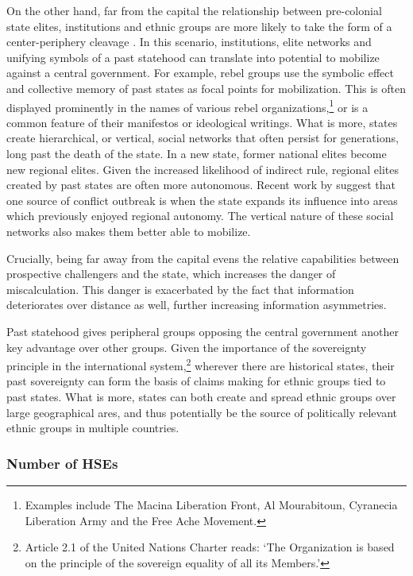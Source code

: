 On the other hand, far from the capital the relationship between pre-colonial
state elites, institutions and ethnic groups are more likely to take the form of
a center-periphery cleavage \citep{1967Psav}. In this scenario, institutions,
elite networks and unifying symbols of a past statehood can translate into
potential to mobilize against a central government. For example, rebel groups
use the symbolic effect and collective memory of past states as focal points for
mobilization. This is often displayed prominently in the names of various rebel
organizations,\footnote{Examples include The Macina Liberation Front, Al
Mourabitoun, Cyranecia Liberation Army and the Free Ache Movement.} or is a
common feature of their manifestos or ideological writings. What is more, states
create hierarchical, or vertical, social networks that often persist for
generations, long past the death of the state. In a new state, former national
elites become new regional elites. Given the increased likelihood of indirect
rule, regional elites created by past states are often more autonomous. Recent
work by \citet{Ying_2020} suggest that one source of conflict outbreak is when
the state expands its influence into areas which previously enjoyed regional
autonomy. The vertical nature of these social networks also makes them better
able to mobilize. 

Crucially, being far away from the capital evens the relative capabilities
between prospective challengers and the state, which increases the danger of
miscalculation. This danger is exacerbated by the fact that information
deteriorates over distance as well, further increasing information asymmetries.

Past statehood gives peripheral groups opposing the central government another
key advantage over other groups. Given the importance of the sovereignty
principle in the international system,\footnote{Article 2.1 of the United Nations
	Charter reads: `The Organization is based on the principle of the
sovereign equality of all its Members.'} wherever there are historical states,
their past sovereignty can form the basis of claims making for ethnic groups
tied to past states. What is more, states can both create and spread ethnic
groups over large geographical ares, and thus potentially be the source of
politically relevant ethnic groups in multiple countries. 

\subsubsection{Number of HSEs} \label{Number of HSEs}

